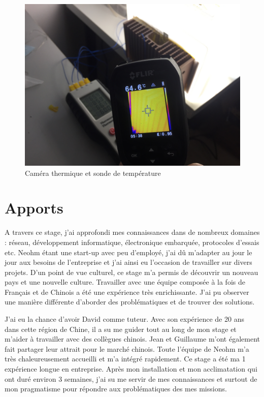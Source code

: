 \documentclass[a4paper, 12pt]{report}
\begin{document}
\begin{figure}[H]
\centering
\includegraphics[scale=0.08]{figures/photos/thermal_camera.jpg}
\caption{Caméra thermique et sonde de température}
\label{fig:temp_test}
\end{figure}



\chapter{Apports}

A travers ce stage, j'ai approfondi mes connaissances dans de nombreux domaines : réseau, développement informatique, électronique embarquée, protocoles d'essais etc. Neohm étant une start-up avec peu d'employé, j'ai dû m'adapter au jour le jour aux besoins de l'entreprise et j'ai ainsi eu l'occasion de travailler sur divers projets. D'un point de vue culturel, ce stage m'a permis de découvrir un nouveau pays et une nouvelle culture. Travailler avec une équipe composée à la fois de Français et de Chinois a été une expérience très enrichissante. J'ai pu observer une manière différente d'aborder des problématiques et de trouver des solutions.

J'ai eu la chance d'avoir David comme tuteur. Avec son expérience de 20 ans dans cette région de Chine, il a su me guider tout au long de mon stage et m'aider à travailler avec des collègues chinois. Jean et Guillaume m'ont également fait partager leur attrait pour le marché chinois. Toute l'équipe de Neohm m'a très chaleureusement accueilli et m'a intégré rapidement.
Ce stage a été ma 1\ieme{} expérience longue en entreprise. Après mon installation et mon acclimatation qui ont duré environ 3 semaines, j'ai su me servir de mes connaissances et surtout de mon pragmatisme pour répondre aux problématiques des mes missions.
\end{document}
